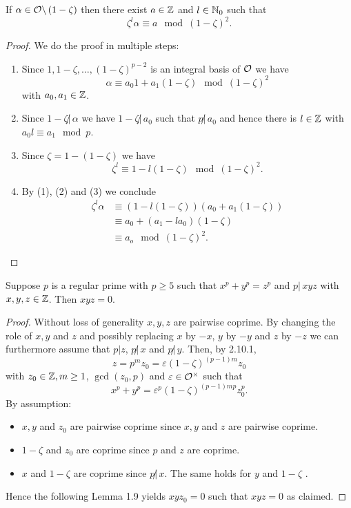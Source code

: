\begin{Lem} If $\alpha \in \mathcal{O} \backslash \left(1-\zeta\right)$ then there exist $a \in \mathbb{Z}$
	and $l \in \mathbb{N}_0$ such that
	\[ \zeta^l \alpha \equiv a \mod (1-\zeta)^2.
	\]
\end{Lem}


\begin{proof} We do the proof in multiple steps:
	\begin{enumerate}[(1)]
		\item Since $1, 1- \zeta, \dots, (1-\zeta)^{p-2}$ is an integral basis 
				of $\mathcal{O}$ we have
				\[ \alpha \equiv a_0 1 + a_1 (1-\zeta) \mod (1-\zeta)^2
				\]
				with $a_0, a_1 \in \mathbb{Z}$.
		\item Since $1-\zeta \not | \, \alpha $ we have $1-\zeta \not | \, a_0 $
				such that $p \not | \, a_0$ and hence there is $l \in\mathbb{Z}$ with
				$a_0 l \equiv a_1 \mod p$.
		\item Since $\zeta = 1-(1-\zeta)$ we have
				\[ \zeta^l \equiv 1- l(1-\zeta) \mod (1-\zeta)^2.
				\]
		\item By (1), (2) and (3) we conclude
				\begin{align*}
				\zeta^l \alpha
				&\equiv \left( 1-l(1-\zeta) \right) \left( a_0 + a_1(1-\zeta) \right)\\
				&\equiv a_0 + \left(a_1 -l a_0  \right) (1-\zeta)\\
				&\equiv a_o \mod (1-\zeta)^2.
				\end{align*}
	\end{enumerate}
\end{proof}


\begin{Prop}
	Suppose $p$ is a regular prime with $p \geq 5$ such that 
	$x^p +y^p = z^p$ and $p  | \, xyz$ with $x,y,z \in \mathbb{Z}$.
	Then $xyz = 0$.
\end{Prop}


\begin{proof}
	Without loss of generality $x,y,z$ are pairwise coprime.
	By changing the role of $x,y$ and $z$ and possibly replacing $x$ by $-x$, $y$ by $-y$ and $z$ by $-z$ we can furthermore assume that $p | z$, $p \not | \, x$
	and $p \not | \, y$. 
	Then, by 2.10.1,
	\[ z = p^m z_0 = \varepsilon \left(1-\zeta\right)^{(p-1)m} z_0
	\]  
	with $z_0 \in \mathbb{Z}, m \geq 1$, $\gcd(z_0,p)$ and $\varepsilon \in \mathcal{O}^\times$
	such that
	\[ x^p+y^p = \varepsilon^p \left(1-\zeta\right)^{(p-1)mp} z_0^p .
	\]
	By assumption:
	\begin{itemize}
		\item $x,y$ and $z_0$ are pairwise coprime since $x,y$ and $z$ are pairwise coprime.
		\item $1-\zeta$ and $z_0$ are coprime since $p$ and $z$ are coprime.
		\item $x$ and $1-\zeta$ are coprime since $p \not | \, x$. The same holds for $y$ and $1-\zeta$ .
	\end{itemize}
	Hence the following Lemma 1.9 yields $xyz_0 = 0$ such that $xyz = 0$ as claimed.
\end{proof}
 
